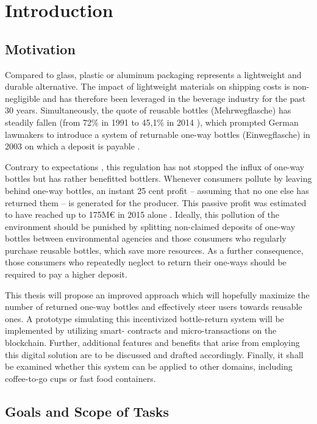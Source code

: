
\chapter{Introduction}

\section{Motivation}
Compared to glass, plastic or aluminum packaging represents a lightweight and durable alternative. The impact of lightweight materials on shipping costs is non-negligible and has therefore been leveraged in the beverage industry for the past 30 years. Simultaneously, the quote of reusable bottles (Mehrwegflasche) has steadily fallen (from 72\% in 1991 \cite[§ 9 Abs. 2]{verpackV} to 45,1\% in 2014 \cite{umweltBundesamt}), which prompted German lawmakers to introduce a system of returnable one-way bottles (Einwegflasche) in 2003 on which a deposit is payable \cite[§ 9 Abs. 2]{verpackV}. 

Contrary to expectations \cite[§ 8]{verpackV} , this regulation has not stopped the influx of one-way bottles but has rather benefitted bottlers. Whenever consumers pollute by leaving behind one-way bottles, an instant 25 cent profit -- assuming that no one else has returned them -- is generated for the producer. This passive profit was estimated to have reached up to 175M\euro{} in 2015 alone \cite{mehrwegSystem}. Ideally, this pollution of the environment should be punished by splitting non-claimed deposits of one-way bottles between environmental agencies and those consumers who regularly purchase reusable bottles, which save more resources. As a further consequence, those consumers who repeatedly neglect to return their one-ways should be required to pay a higher deposit.

This thesis will propose an improved approach which will hopefully maximize the number of returned one-way bottles and effectively steer users towards reusable ones. A prototype simulating this incentivized bottle-return system will be implemented by utilizing smart- contracts and micro-transactions on the blockchain. Further, additional features and benefits that arise from employing this digital solution are to be discussed and drafted accordingly. Finally, it shall be examined whether this system can be applied to other domains, including coffee-to-go cups or fast food containers.

\section{Goals and Scope of Tasks}